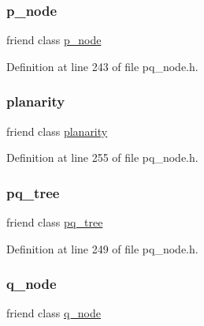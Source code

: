 \subsubsection{\texorpdfstring{p\+\_\+node}{p\_node}}
{\footnotesize\ttfamily friend class \mbox{\hyperlink{classp__node}{p\+\_\+node}}\hspace{0.3cm}{\ttfamily [friend]}}



Definition at line 243 of file pq\+\_\+node.\+h.

\mbox{\label{classpq__node_ab6a02224dbc06343d95919289aec77c8}} 
\subsubsection{\texorpdfstring{planarity}{planarity}}
{\footnotesize\ttfamily friend class \mbox{\hyperlink{classplanarity}{planarity}}\hspace{0.3cm}{\ttfamily [friend]}}



Definition at line 255 of file pq\+\_\+node.\+h.

\mbox{\label{classpq__node_a0a5be4bb438c891059fae98f607f2a9c}} 
\subsubsection{\texorpdfstring{pq\+\_\+tree}{pq\_tree}}
{\footnotesize\ttfamily friend class \mbox{\hyperlink{classpq__tree}{pq\+\_\+tree}}\hspace{0.3cm}{\ttfamily [friend]}}



Definition at line 249 of file pq\+\_\+node.\+h.

\mbox{\label{classpq__node_ab10214fc73d6d72fa7ac390344a4fa46}} 
\subsubsection{\texorpdfstring{q\+\_\+node}{q\_node}}
{\footnotesize\ttfamily friend class \mbox{\hyperlink{classq__node}{q\+\_\+node}}\hspace{0.3cm}{\ttfamily [friend]}}



